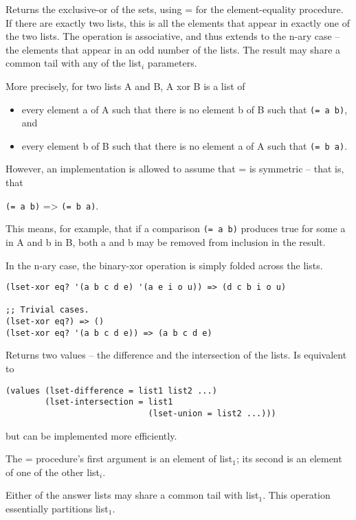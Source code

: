 \begin{entry}{%
  }

  Returns the exclusive-or of the sets, using = for the
  element-equality procedure. If there are exactly two lists, this is
  all the elements that appear in exactly one of the two lists. The
  operation is associative, and thus extends to the n-ary case -- the
  elements that appear in an odd number of the lists. The result may
  share a common tail with any of the list$_i$ parameters.

  More precisely, for two lists A and B, A xor B is a list of

\begin{itemize}
  \tightlist
\item every element a of A such that there is no element b of B such
  that \texttt{(=\ a\ b)}, and
\item every element b of B such that there is no element a of A such
  that \texttt{(=\ b\ a)}.
\end{itemize}

However, an implementation is allowed to assume that = is symmetric --
that is, that

\texttt{(=\ a\ b)} =\textgreater{} \texttt{(=\ b\ a)}.

This means, for example, that if a comparison \texttt{(=\ a\ b)}
produces true for some a in A and b in B, both a and b may be removed
from inclusion in the result.

In the n-ary case, the binary-xor operation is simply folded across
the lists.

\begin{verbatim}
(lset-xor eq? '(a b c d e) '(a e i o u)) => (d c b i o u)

;; Trivial cases.
(lset-xor eq?) => ()
(lset-xor eq? '(a b c d e)) => (a b c d e)
\end{verbatim}
\end{entry}

\begin{entry}{%
  }

  Returns two values -- the
  difference and the intersection of the lists.  Is equivalent to

\begin{verbatim}
(values (lset-difference = list1 list2 ...)
        (lset-intersection = list1
                             (lset-union = list2 ...)))
\end{verbatim}

  but can be implemented more efficiently.

  The = procedure's first argument is an element of list$_1$; its
  second is an element of one of the other list$_i$.

  Either of the answer lists may share a common tail with
  list$_1$. This operation essentially partitions list$_1$.
\end{entry}

